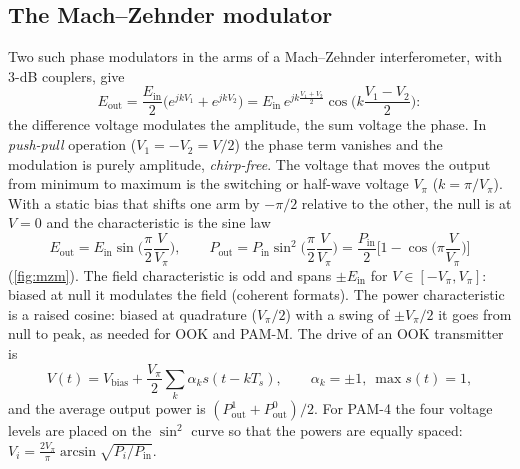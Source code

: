 \subsection{The Mach--Zehnder modulator}
Two such phase modulators in the arms of a Mach--Zehnder interferometer, with 3-dB couplers,
give
\begin{equation}
  E_{\mathrm{out}}=\frac{E_{\mathrm{in}}}{2}\big(e^{jkV_1}+e^{jkV_2}\big)
  =E_{\mathrm{in}}\,e^{jk\frac{V_1+V_2}{2}}\cos\Big(k\frac{V_1-V_2}{2}\Big):
  \label{eq:mzm}
\end{equation}
the difference voltage modulates the amplitude, the sum voltage the phase. In \emph{push-pull}
operation ($V_1=-V_2=V/2$) the phase term vanishes and the modulation is purely amplitude,
\emph{chirp-free}. The voltage that moves the output from minimum to maximum is the switching or
half-wave voltage $V_\pi$ ($k=\pi/V_\pi$). With a static bias that shifts one arm by $-\pi/2$ relative
to the other, the null is at $V=0$ and the characteristic is the sine law
\begin{equation}
  E_{\mathrm{out}}=E_{\mathrm{in}}\sin\Big(\frac\pi2\frac{V}{V_\pi}\Big),\qquad
  P_{\mathrm{out}}=P_{\mathrm{in}}\sin^2\Big(\frac\pi2\frac{V}{V_\pi}\Big)=\frac{P_{\mathrm{in}}}{2}\Big[1-\cos\Big(\pi\frac{V}{V_\pi}\Big)\Big]
\end{equation}
(\cref{fig:mzm}). The field characteristic is odd and spans $\pm E_{\mathrm{in}}$ for $V\in[-V_\pi,V_\pi]$: biased at
null it modulates the field (coherent formats). The power characteristic is a raised cosine:
biased at quadrature ($V_\pi/2$) with a swing of $\pm V_\pi/2$ it goes from null to peak, as needed for
OOK and PAM-M. The drive of an OOK transmitter is
\begin{equation}
  V(t)=V_{\mathrm{bias}}+\frac{V_\pi}{2}\sum_k\alpha_ks(t-kT_s),\qquad \alpha_k=\pm1,\ \max s(t)=1,
\end{equation}
and the average output power is $(P_{\mathrm{out}}^1+P_{\mathrm{out}}^0)/2$. For PAM-4 the four voltage levels are
placed on the $\sin^2$ curve so that the powers are equally spaced:
$V_i=\frac{2V_\pi}{\pi}\arcsin\sqrt{P_i/P_{\mathrm{in}}}$.

